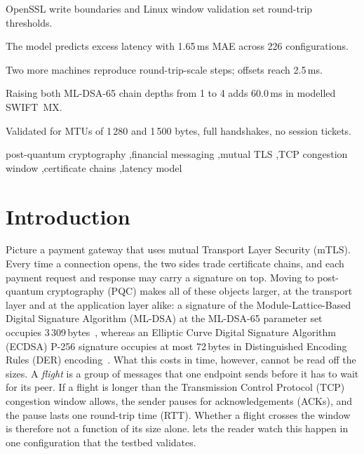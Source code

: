 \documentclass[preprint,12pt]{elsarticle}
\newcommand{\ms}{\,ms\xspace}
\begin{document}
\begin{frontmatter}
\begin{highlights}
\item OpenSSL write boundaries and Linux window validation set round-trip thresholds.
\item The model predicts excess latency with 1.65\ms MAE across 226 configurations.
\item Two more machines reproduce round-trip-scale steps; offsets reach 2.5\ms.
\item Raising both ML-DSA-65 chain depths from 1 to 4 adds 60.0\ms in modelled SWIFT~MX.
\item Validated for MTUs of 1\,280 and 1\,500 bytes, full handshakes, no session tickets.
\end{highlights}

\begin{keyword}
post-quantum cryptography \sep financial messaging \sep mutual TLS \sep TCP congestion window \sep certificate chains \sep latency model
\end{keyword}
\end{frontmatter}

\section{Introduction}
\label{sec:intro}

Picture a payment gateway that uses mutual Transport Layer Security (mTLS). Every time a connection opens, the two sides trade certificate chains, and each payment request and response may carry a signature on top. Moving to post-quantum cryptography (PQC) makes all of these objects larger, at the transport layer and at the application layer alike: a signature of the Module-Lattice-Based Digital Signature Algorithm (ML-DSA) at the ML-DSA-65 parameter set occupies 3\,309\,bytes~\cite{fips204}, whereas an Elliptic Curve Digital Signature Algorithm (ECDSA) P-256 signature occupies at most 72\,bytes in Distinguished Encoding Rules (DER) encoding~\cite{fips186}. What this costs in time, however, cannot be read off the sizes. A \emph{flight} is a group of messages that one endpoint sends before it has to wait for its peer. If a flight is longer than the Transmission Control Protocol (TCP) congestion window allows, the sender pauses for acknowledgements (ACKs), and the pause lasts one round-trip time (RTT). Whether a flight crosses the window is therefore not a function of its size alone.  lets the reader watch this happen in one configuration that the testbed validates.
\end{document}
